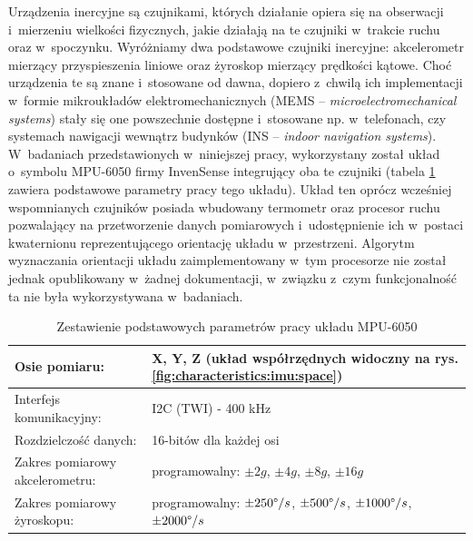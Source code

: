 Urządzenia inercyjne są czujnikami, których działanie opiera się na obserwacji i~mierzeniu wielkości fizycznych, jakie działają na te czujniki w~trakcie ruchu oraz w~spoczynku. Wyróżniamy dwa podstawowe czujniki inercyjne: akcelerometr mierzący przyspieszenia liniowe oraz żyroskop mierzący prędkości kątowe. Choć urządzenia te są znane i~stosowane od dawna, dopiero z~chwilą ich implementacji w~formie mikroukładów elektromechanicznych (MEMS -- \emph{microelectromechanical systems}) stały się one powszechnie dostępne i~stosowane np. w~telefonach, czy systemach nawigacji wewnątrz budynków (INS -- \emph{indoor navigation systems}). W~badaniach przedstawionych w~niniejszej pracy, wykorzystany został układ o~symbolu MPU-6050 firmy InvenSense integrujący oba te czujniki (tabela \ref{tab:characteristics:mpu:spec} zawiera podstawowe parametry pracy tego układu). Układ ten oprócz wcześniej wspomnianych czujników posiada wbudowany termometr oraz procesor ruchu pozwalający na przetworzenie danych pomiarowych i~udostępnienie ich w~postaci kwaternionu reprezentującego orientację układu w~przestrzeni. Algorytm wyznaczania orientacji układu zaimplementowany w~tym procesorze nie został jednak opublikowany w~żadnej dokumentacji, w~związku z~czym funkcjonalność ta nie była wykorzystywana w~badaniach.
		
\begin{table}[!htp]
	\caption{Zestawienie podstawowych parametrów pracy układu MPU-6050\cite{ivenSense:MPU6050}}
	\label{tab:characteristics:mpu:spec}
	\noindent
	\small
	\centering
	\begin{tabular}{|p{5cm}|p{8cm}|}
		\hline 
		Osie pomiaru:                             & X, Y, Z \newline (układ współrzędnych widoczny na rys. \ref{fig:characteristics:imu:space})               \\
		\hline
		Interfejs komunikacyjny:                  & I2C (TWI) - 400 kHz                                                                                           \\
		\hline
		Rozdzielczość danych:                   & 16-bitów dla każdej osi                                                                                     \\
		\hline
		Zakres pomiarowy  \newline akcelerometru: & programowalny: \newline $\pm2g$, \textbf{$\pm4g$}, $\pm8g$, $\pm16g$                                          \\
		\hline
		Zakres pomiarowy żyroskopu:              & programowalny: \newline $\pm250\degree/s$, \textbf{$\pm500\degree/s$}, $\pm1000\degree/s$, $\pm2000\degree/s$ \\
		\hline
	\end{tabular} 	
\end{table} 
		

